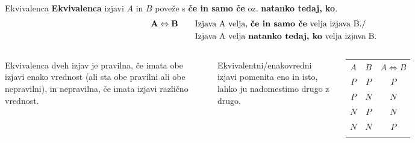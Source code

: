         \begin{frame}
            \begin{alertblock}{Ekvivalenca}
                \textbf{Ekvivalenca} izjavi $A$ in $B$ poveže s \textbf{če in samo če} oz.
                \textbf{natanko tedaj, ko}.
                \begin{align*} 
                    \mathbf{A\Leftrightarrow B} \quad \quad &\textmd{Izjava A velja, \textbf{če in
                    samo če} velja izjava B.} / \\
                        &\textmd{Izjava A velja \textbf{natanko tedaj, ko} velja izjava B.}
                \end{align*}
            \end{alertblock}


            \begin{columns}
                    \begin{alertblock}{}
                        Ekvivalenca dveh izjav je pravilna, če imata obe izjavi enako vrednost 
                        (ali sta obe pravilni ali obe nepravilni), in nepravilna, če imata izjavi
                        različno vrednost.
                    \end{alertblock}
                    \begin{block}{}
                        Ekvivalentni/enakovredni izjavi pomenita eno in isto, lahko ju nadomestimo 
                        drugo z drugo.
                    \end{block}

                    \begin{table}
                        \centering
                        \begin{tabular}{||c|c|c||} 
                        \hhline{|t:===:t|}
                        \rowcolor[rgb]{0.843,0.718,0.718} $A$ & $B$ & $A\Leftrightarrow B$  \\ 
                        \hhline{|:===:|}
                        $P$ & $P$ & $P$                         \\ 
                        \hline
                        $P$ & $N$ & $N$                         \\ 
                        \hline
                        $N$ & $P$ & $N$                         \\ 
                        \hline
                        $N$ & $N$ & $P$                         \\
                        \hhline{|b:===:b|}
                        \end{tabular}
                    \end{table}

            \end{columns}
        \end{frame}



